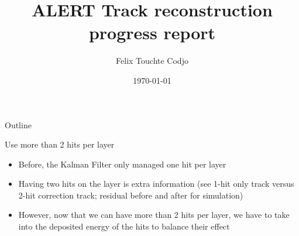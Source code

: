 \documentclass[10pt,aspectratio=43]{beamer}
\title{ALERT Track reconstruction \\progress report}
\author{Felix Touchte Codjo}
\institute{IJCLab}
\date{\today}
\begin{document}
\begin{frame}[plain] %
\titlepage
\end{frame}

\begin{frame}{Outline}
\tableofcontents
\end{frame}


\begin{frame}{Use more than 2 hits per layer}
    \begin{itemize}
        \item Before, the Kalman Filter only managed one hit per layer
        \item Having two hits on the layer is extra information (see 1-hit only track versus 2-hit correction track; residual before and after for simulation)
        \item However, now that we can have more than 2 hits per layer, we have to take into the deposited energy of the hits to balance their effect
        
    \end{itemize}
    \vspace{0.2cm}




\end{frame}
\end{document}
